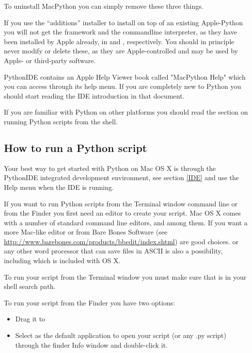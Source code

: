 To uninstall MacPython you can simply remove these three things.

If you use the ``additions'' installer to install on top of an existing
Apple-Python you will not get the framework and the commandline interpreter,
as they have been installed by Apple already, in
 and
, respectively. You should in principle never modify
or delete these, as they are Apple-controlled and may be used by Apple- or
third-party software.

PythonIDE contains an Apple Help Viewer book called "MacPython Help"
which you can access through its help menu. If you are completely new to
Python you should start reading the IDE introduction in that document.

If you are familiar with Python on other \UNIX{} platforms you should
read the section on running Python scripts from the \UNIX{} shell.

\subsection{How to run a Python script}

Your best way to get started with Python on Mac OS X is through the PythonIDE
integrated development environment, see section \ref{IDE} and use the Help
menu when the IDE is running.

If you want to run Python scripts from the Terminal window command line
or from the Finder you first need an editor to create your script.
Mac OS X comes with a number of standard \UNIX{} command line editors,
 and  among them. If you want a more Mac-like
editor  or  from Bare Bones Software
(see \url{http://www.barebones.com/products/bbedit/index.shtml}) are
good choices.   or any other
word processor that can save files in ASCII is also a possibility, including
 which is included with OS X.

To run your script from the Terminal window you must make sure that
 is in your shell search path. 

To run your script from the Finder you have two options:
\begin{itemize}
    \item Drag it to 
    \item Select  as the default application
    to open your script (or any .py script) through the finder Info window
    and double-click it.
\end{itemize}

